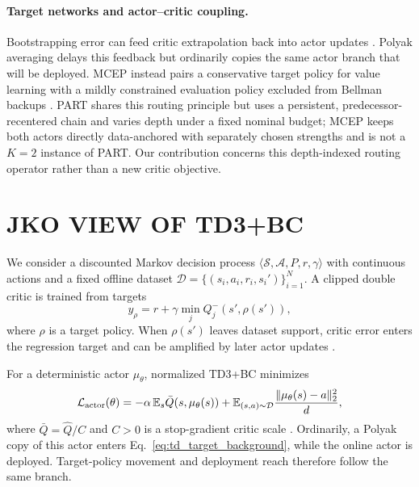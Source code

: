 \documentclass[twoside]{article}
\begin{document}
\paragraph{Target networks and actor--critic coupling.}
Bootstrapping error can feed critic extrapolation back into actor updates
\citep{fujimoto2019offpolicy,kumar2019bear}. Polyak averaging delays this
feedback but ordinarily copies the same actor branch that will be deployed.
MCEP instead pairs a conservative target policy for value learning with a
mildly constrained evaluation policy excluded from Bellman backups
\citep{xu2024mcep}. PART shares this routing principle but uses a persistent,
predecessor-recentered chain and varies depth under a fixed nominal budget;
MCEP keeps both actors directly data-anchored with separately chosen strengths
and is not a $K=2$ instance of PART. Our contribution concerns this depth-indexed
routing operator rather than a new critic objective.

\section{JKO VIEW OF TD3+BC}
\label{sec:background}

We consider a discounted Markov decision process
$\langle\mathcal S,\mathcal A,P,r,\gamma\rangle$ with continuous actions and
a fixed offline dataset $\mathcal D=\{(s_i,a_i,r_i,s_i')\}_{i=1}^N$. A clipped
double critic is trained from targets
\begin{equation}
y_{\rho}=r+\gamma\min_j Q_j^-(s',\rho(s')),
\label{eq:td_target_background}
\end{equation}
where $\rho$ is a target policy. When $\rho(s')$ leaves dataset support,
critic error enters the regression target and can be amplified by later actor
updates \citep{fujimoto2019offpolicy,kumar2019bear}.

For a deterministic actor $\mu_\theta$, normalized TD3+BC minimizes
\begin{equation}
\mathcal L_{\rm actor}(\theta)
=-\alpha\,\mathbb E_s\bar Q(s,\mu_\theta(s))
+\mathbb E_{(s,a)\sim\mathcal D}\frac{\|\mu_\theta(s)-a\|_2^2}{d},
\label{eq:td3bc_background}
\end{equation}
where $\bar Q=\widehat Q/C$ and $C>0$ is a stop-gradient critic scale
\citep{fujimoto2021minimalist}. Ordinarily, a Polyak copy of this actor enters
Eq.~\eqref{eq:td_target_background}, while the online actor is deployed.
Target-policy movement and deployment reach therefore follow the same branch.
\end{document}

